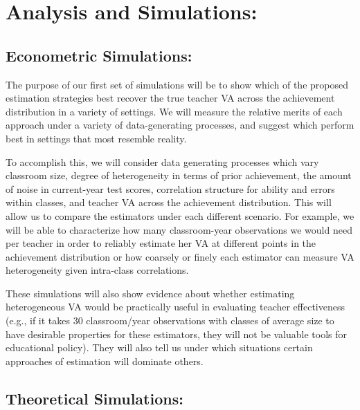 \documentclass[letterpaper,12pt]{article}
\begin{document}
\section{Analysis and Simulations:}


\subsection{Econometric Simulations:}

The purpose of our first set of simulations will be to show which of the proposed estimation strategies best recover the true teacher VA across the achievement distribution in a variety of settings. We will measure the relative merits of each approach under a variety of data-generating processes, and suggest which perform best in settings that most resemble reality.

To accomplish this, we will consider data generating processes which vary classroom size, degree of heterogeneity in terms of prior achievement, the amount of noise in current-year test scores, correlation structure for ability and errors within classes, and teacher VA across the achievement distribution. This will allow us to compare the estimators under each different scenario. For example, we will be able to characterize how many classroom-year observations we would need per teacher in order to reliably estimate her VA at different points in the achievement distribution or how coarsely or finely each estimator can measure VA heterogeneity given intra-class correlations. 

These simulations will also show evidence about whether estimating heterogeneous VA would be practically useful in evaluating teacher effectiveness (e.g., if it takes 30 classroom/year observations with classes of average size to have desirable properties for these estimators, they will not be valuable tools for educational policy). They will also tell us under which situations certain approaches of estimation will dominate others.


\subsection{Theoretical Simulations:}
\end{document}
